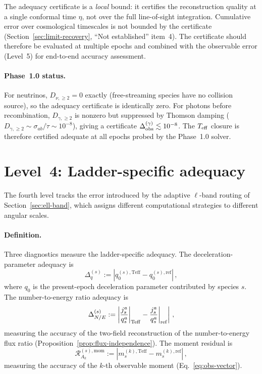 The adequacy certificate is a \emph{local} bound: it
certifies the reconstruction quality at a single
conformal time $\eta$, not over the full line-of-sight
integration.  Cumulative error over cosmological
timescales is not bounded by the certificate
(Section~\ref{sec:limit-recovery}, ``Not established''
item~4).  The certificate should therefore be evaluated
at multiple epochs and combined with the observable error
(Level~5) for end-to-end accuracy assessment.


\paragraph{Phase~1.0 status.}

For neutrinos, $D_{\nu,\geq 2} = 0$ exactly
(free-streaming species have no collision source), so the
adequacy certificate is identically zero.  For photons
before recombination, $D_{\gamma,\geq 2}$ is nonzero but
suppressed by Thomson damping ($D_{\gamma,\geq 2} \sim
\sigma_{ab}/\dot{\tau} \sim 10^{-8}$), giving a certificate
$\Delta_{\rm obs}^{(\gamma)} \lesssim 10^{-8}$.  The
$T_{\mathrm{eff}}$ closure is therefore certified adequate at all
epochs probed by the Phase~1.0 solver.


\section{Level~4: Ladder-specific adequacy}
\label{sec:err-ladder}

The fourth level tracks the error introduced by the
adaptive $\ell$-band routing of
Section~\ref{sec:ell-band}, which assigns different
computational strategies to different angular scales.


\paragraph{Definition.}

Three diagnostics measure the ladder-specific adequacy.
The deceleration-parameter adequacy is
\begin{equation}\label{eq:err-Dq}
\Delta_q^{(s)}
:= \left|
  q^{(s),\text{Teff}}_0
  - q^{(s),\text{ref}}_0
\right|\,,
\end{equation}
where $q_0$ is the present-epoch deceleration parameter
contributed by species $s$.  The number-to-energy ratio
adequacy is
\begin{equation}\label{eq:err-DNE}
\Delta_{N/E}^{(s)}
:= \left|
  \frac{j_s^a}{q_s^a}\bigg|_{\rm Teff}
  - \frac{j_s^a}{q_s^a}\bigg|_{\rm ref}
\right|\,,
\end{equation}
measuring the accuracy of the two-field reconstruction of
the number-to-energy flux ratio
(Proposition~\ref{prop:flux-independence}).  The moment
residual is
\begin{equation}\label{eq:err-Rmom}
\mathcal{R}_{A_k}^{(s),\text{mom}}
:= \left|
  m_s^{(k),\text{Teff}}
  - m_s^{(k),\text{ref}}
\right|\,,
\end{equation}
measuring the accuracy of the $k$-th observable moment
(Eq.~\ref{eq:obs-vector}).


